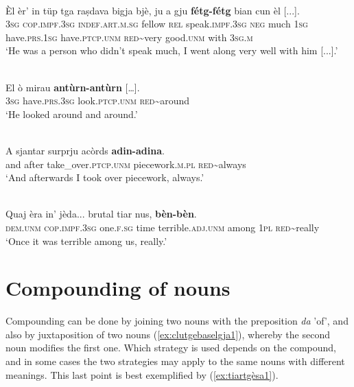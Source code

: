 \ea\label{ex:redadv1}
\\
\gll  Èl èr’ in tüp tga raṣdava bigja bjè, ju a gju \textbf{fétg-fétg} bian cun èl [...]. \\
\textsc{3sg} \textsc{cop.impf.3sg} \textsc{indef.art.m.sg} fellow \textsc{rel} speak.\textsc{impf.3sg} \textsc{neg} much \textsc{1sg} have.\textsc{prs.1sg} have.\textsc{ptcp.unm} \textsc{red}\textasciitilde{very} good.\textsc{unm} with \textsc{3sg.m}\\
\glt `He was a person who didn’t speak much, I went along very well with him [...].'
\z

\ea\label{ex:redadv2}
\\
\gll El ò mirau \textbf{antùrn-antùrn} […].\\
\textsc{3sg} have.\textsc{prs.3sg} look.\textsc{ptcp.unm} \textsc{red}\textasciitilde{around} \\
\glt `He looked around and around.'
\z

\ea\label{ex:redadv3}
\\
\gll    A sjantar surprju acòrds \textbf{adin-adina}.\\
and after take\_over.\textsc{ptcp.unm} piecework.\textsc{m.pl} \textsc{red}\textasciitilde{always} \\
\glt `And afterwards I took over piecework, always.'
\z

\ea\label{ex:redadv4}
\\
\gll Quaj èra in’ jèda... brutal tiar nus, \textbf{bèn-bèn}.   \\
\textsc{dem.unm} \textsc{cop.impf.3sg} one.\textsc{f.sg} time terrible.\textsc{adj.unm} among \textsc{1pl} \textsc{red}\textasciitilde{really}\\
\glt `Once it was terrible among us, really.'
\z

\section{Compounding of nouns}
Compounding can be done by joining two nouns with the preposition \textit{da} 'of', and also by juxtaposition of two nouns (\ref{ex:clutgebaselgja1}), whereby the second noun modifies the first one. Which strategy is used depends on the compound, and in some cases the two strategies may apply to the same nouns with different meanings. This last point is best exemplified by (\ref{ex:tiartgèsa1}).


